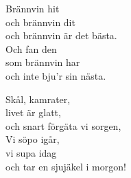 \documentclass[a6paper, 10pt, twoside]{article}
\begin{document}
\newpage
\noindent
\begin{center}
\end{center}
\begin{lyrics}
Brännvin hit \\
och brännvin dit \\
och brännvin är det bästa. \\
Och fan den \\
som brännvin har \\
och inte bju'r sin nästa. 
\end{lyrics}
\vspace{10pt}
\begin{center}
\end{center}
\begin{lyrics}
\vspace{-5pt}
Skål, kamrater, \\
livet är glatt, \\
och snart förgäta vi sorgen, \\
Vi söpo igår, \\
vi supa idag \\
och tar en sjujäkel i morgon!
\end{lyrics}
\end{document}
